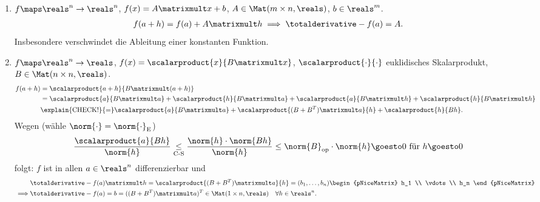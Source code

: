 \begin{beispiele*}
    \begin{enumerate}
        \item \( f\maps \reals^n\to \reals^n \), \( f(x)=A\matrixmult x+b \), \( A\in \Mat(m\times n, \reals) \), \( b\in \reals^m \).
        \begin{align*}
            f(a+h)=f(a)+A\matrixmult h\implies \totalderivative-{f}(a)=A.
        \end{align*}
        Insbesondere verschwindet die Ableitung einer konstanten Funktion.
    \item \( f\maps \reals^n \to \reals\), \( f(x)=\scalarproduct{x}{B\matrixmult x} \), \( \scalarproduct{\cdot}{\cdot} \) euklidisches Skalarprodukt, \( B\in \Mat(n\times n, \reals) \).
    \begin{align*}
        f(a+h)\begin{aligned}[t]
            &=\scalarproduct{a+h}{B\matrixmult (a+h)}\\
            &=\scalarproduct{a}{B\matrixmult a}+\scalarproduct{h}{B\matrixmult a}+\scalarproduct{a}{B\matrixmult h}+\scalarproduct{h}{B\matrixmult h}\\
            &\explain{\text{CHECK!}}{=}\scalarproduct{a}{B\matrixmult a}+\scalarproduct{(B+B^T)\matrixmult a}{h}+\scalarproduct{h}{Bh}. 
        \end{aligned}                
    \end{align*}
    Wegen (wähle \( \norm{\cdot}=\norm{\cdot}_{\text{E}} \))
    \begin{align*}
        \frac{\scalarproduct{a}{Bh}}{\norm{h}}\underset{\text{C-S}}{\leq}\frac{\norm{h}\cdot\norm{Bh}}{\norm{h}}\leq \norm{B}_{\text{op}}\cdot\norm{h}\goesto 0  \text{ für }h\goesto 0
    \end{align*}
    folgt: \( f \) ist in allen \( a\in \reals^n \) differenzierbar und
    \begin{align*}
        &\totalderivative-{f}(a)\matrixmult h=\scalarproduct{(B+B^T)\matrixmult a}{h}=(b_1,\dots,b_n)\begin{pNiceMatrix} h_1 \\ \vdots \\ h_n \end{pNiceMatrix}\\
        \implies &\totalderivative-{f}(a)=b=((B+B^T)\matrixmult a)^T\in \Mat(1\times n,\reals)\quad \forall h\in \reals^n. 
    \end{align*}
    \end{enumerate}
\end{beispiele*}
